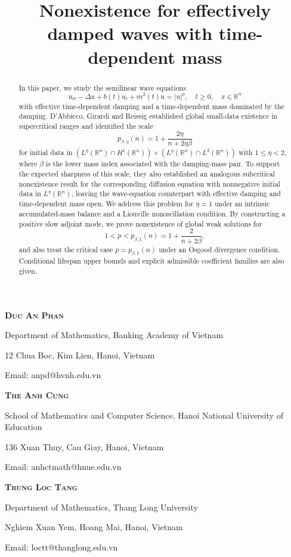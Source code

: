 \documentclass[11pt,reqno]{amsart}
\theoremstyle{definition}
\theoremstyle{remark}
\begin{document}
 
	\title[Nonexistence for damped waves]{Nonexistence for effectively damped waves with time-dependent mass}
	
	
	\maketitle
	\centerline{\scshape \textbf{Duc An Phan}}
	{\footnotesize
		\centerline{Department of Mathematics, Banking Academy of Vietnam}
		\centerline{12 Chua Boc, Kim Lien, Hanoi, Vietnam}
		\centerline{Email: anpd@hvnh.edu.vn}}
	\medskip
	
	\centerline{\scshape \textbf{The Anh Cung}}
	{\footnotesize
		\centerline{School of Mathematics and Computer Science, Hanoi National University of Education}
		\centerline{136 Xuan Thuy, Cau Giay, Hanoi, Vietnam}
		\centerline{Email: anhctmath@hnue.edu.vn}}
	\medskip
	
	\centerline{\scshape \textbf{Trung Loc Tang}}
	{\footnotesize
		\centerline{Department of Mathematics, Thang Long University}
		\centerline{Nghiem Xuan Yem, Hoang Mai, Hanoi, Vietnam}
		\centerline{Email: loctt@thanglong.edu.vn}}
	
	\begin{abstract}
		In this paper, we study the semilinear wave equations
		$$
		u_{tt}-\Delta u+b(t)u_t+m^2(t)u=|u|^p, \quad t \geq 0, \quad x\in\mathbb{R}^n
		$$
		with effective time-dependent damping and a time-dependent mass dominated by the damping. D'Abbicco, Girardi and Reissig established global small-data existence in supercritical ranges and identified the scale
		$$
		p_{\beta,\eta}(n)=1+\frac{2\eta}{n+2\eta\beta}
		$$
		for initial data in $(L^\eta(\mathbb R^n)\cap H^1(\mathbb R^n))\times(L^\eta(\mathbb R^n)\cap L^2(\mathbb R^n))$ with $1\leq\eta<2$, where $\beta$ is the lower mass index associated with the damping-mass pair. To support the expected sharpness of this scale, they also established an analogous subcritical nonexistence result for the corresponding diffusion equation with nonnegative initial data in $L^\eta(\mathbb{R}^n)$, leaving the wave-equation counterpart with effective damping and time-dependent mass open. We address this problem for $\eta=1$ under an intrinsic accumulated-mass balance and a Liouville nonoscillation condition. By constructing a positive slow adjoint mode, we prove nonexistence of global weak solutions for
		$$
		1<p<p_{\beta,1}(n)=1+\frac{2}{n+2\beta},
		$$
		and also treat the critical case $p=p_{\beta,1}(n)$ under an Osgood divergence condition. Conditional lifespan upper bounds and explicit admissible coefficient families are also given.
	\end{abstract}
	
\end{document}
